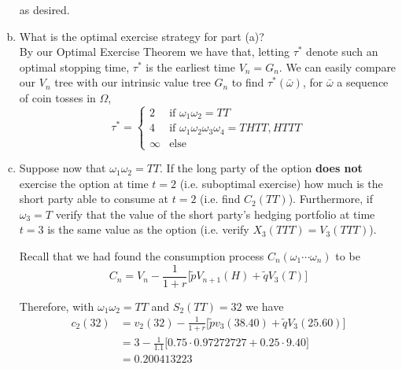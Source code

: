 \documentclass[12pt]{article}
\newlength\tindent
\renewcommand{\indent}{\hspace*{\tindent}}
\begin{document}
\begin{enumerate}[(a)]
	as desired.
	
	\item What is the optimal exercise strategy for part (a)? \\
	
	\indent By our Optimal Exercise Theorem we have that, letting $\tau^*$ denote such an optimal stopping time, $\tau^*$ is the earliest time $V_n = G_n$. We can easily compare our $V_n$ tree with our intrinsic value tree $G_n$ to find $\tau^*(\bar{\omega})$, for $\bar{\omega}$ a sequence of coin tosses in $\Omega$,
	\begin{equation*}
		\tau^* =
		\begin{cases}
			2 & \text{if } \omega_1\omega_2 = TT \\
			4 & \text{if } \omega_1\omega_2\omega_3\omega_4 = THTT, HTTT \\
			\infty & \text{else}
		\end{cases}
	\end{equation*}
	
	\item Suppose now that $\omega_1\omega_2 = TT$. If the long party of the option {\bf does not} exercise the option at time $t = 2$ (i.e. suboptimal exercise) how much is the short party able to consume at $t = 2$ (i.e. find $C_2(TT)$). Furthermore, if $\omega_3 = T$ verify that the value of the short party's hedging portfolio at time $t = 3$ is the same value as the option (i.e. verify $X_3(TTT) = V_3(TTT)$). 
	
	Recall that we had found the consumption process $C_n(\omega_1\cdots\omega_n)$ to be
	\begin{equation*}
		C_n = V_n - \frac{1}{1 + r}\Big[\tilde{p}V_{n + 1}(H) + \tilde{q}V_3(T)\Big]
	\end{equation*}
	
	Therefore, with	$\omega_1\omega_2 = TT$ and $S_2(TT) = 32$ we have
	\begin{align*}
		c_2(32) &= v_2(32) - \frac{1}{1 + r}\Big[\tilde{p}v_3(38.40) + \tilde{q}V_3(25.60)\Big] \\
		&= 3 - \frac{1}{1.1}\Big[0.75 \cdot 0.97272727 + 0.25\cdot9.40\Big] \\
		&= 0.200413223
	\end{align*}
	

\end{enumerate}
\end{document}
